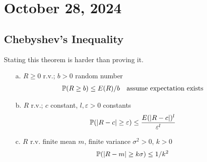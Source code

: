 \section{October 28, 2024}

\subsection{Chebyshev's Inequality}
Stating this theorem is harder than proving it.
\begin{theorem}
    \begin{enumerate}
        \item[a.] $R \ge 0$ r.v.; $b > 0$ random number
        \begin{align}
            \mathbb{P}(R \ge b) \le E(R)/b && \text{assume expectation exists}
        \end{align}
        \item[b.] $R$ r.v.; $c$ constant, $l, \varepsilon > 0$ constants
        \begin{align}
            \mathbb{P}(\abs{R - c} \ge \varepsilon) \le \frac{E(\abs{R-c})^l}{\varepsilon^l}
        \end{align}
        \item[c.] $R$ r.v. finite mean $m$, finite variance $\sigma^2 > 0$, $k > 0$
        \begin{align}
            \mathbb{P}(\abs{R-m} \ge k\sigma) \le 1/k^2
        \end{align}
    \end{enumerate}
\end{theorem}

